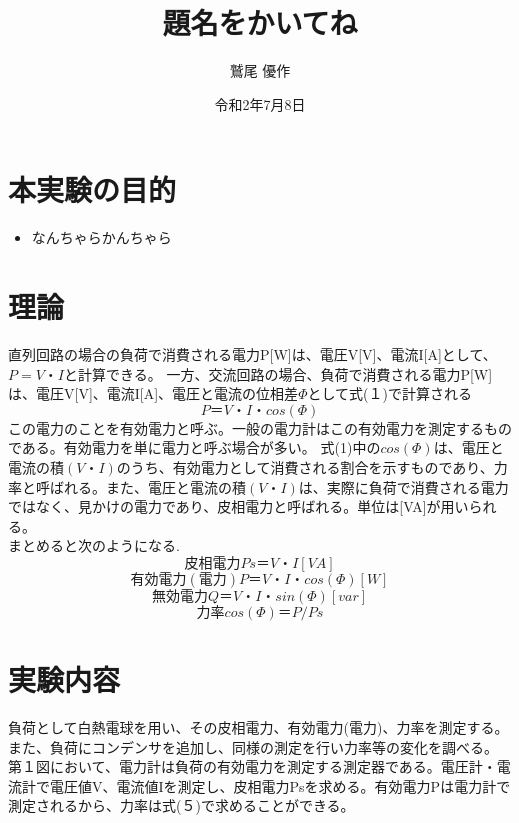 \documentclass[titlepage]{jarticle}
\title{題名をかいてね}
\author{鷲尾 優作}
\date{令和2年7月8日}
\begin{document}
\maketitle

\section{本実験の目的}
\begin{itemize}
    \item なんちゃらかんちゃら
\end{itemize}

\section{理論}
直列回路の場合の負荷で消費される電力P[W]は、電圧V[V]、電流I[A]として、$P=V・I$と計算できる。
一方、交流回路の場合、負荷で消費される電力P[W]は、電圧V[V]、電流I[A]、電圧と電流の位相差$Φ$として式(１)で計算される\\

\begin{equation}
    P＝V・I・cos(Φ)
\end{equation}
この電力のことを有効電力と呼ぶ。一般の電力計はこの有効電力を測定するものである。有効電力を単に電力と呼ぶ場合が多い。
式(1)中の$cos(Φ)$は、電圧と電流の積$(V・I)$のうち、有効電力として消費される割合を示すものであり、力率と呼ばれる。また、電圧と電流の積$(V・I)$は、実際に負荷で消費される電力ではなく、見かけの電力であり、皮相電力と呼ばれる。単位は[VA]が用いられる。\\
まとめると次のようになる.\\
\begin{equation}
    皮相電力	 Ps＝V・I	        [VA]
\end{equation}
\begin{equation}
    有効電力(電力)　  P＝V・I・cos(Φ)　　　[W]
\end{equation}
\begin{equation}
    無効電力　　　　 Q＝V・I・sin(Φ)　　　 [var]
\end{equation}
\begin{equation}
    力率		 cos(Φ)＝P/Ps
\end{equation}

\section{実験内容}
負荷として白熱電球を用い、その皮相電力、有効電力(電力)、力率を測定する。また、負荷にコンデンサを追加し、同様の測定を行い力率等の変化を調べる。
第１図において、電力計は負荷の有効電力を測定する測定器である。電圧計・電流計で電圧値V、電流値Iを測定し、皮相電力Psを求める。有効電力Pは電力計で測定されるから、力率は式(５)で求めることができる。
\end{document}
